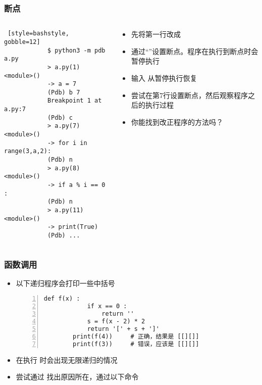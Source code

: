 \begin{CJK}{UTF8}{gbsn}
\begin{frame} [fragile]
	\frametitle{断点}
	\begin{columns}[T]
		\begin{column}[T]{.5\textwidth}
			{\small
			\begin{lstlisting} [style=bashstyle, gobble=12]
			$ python3 -m pdb a.py
			> a.py(1)<module>()
			-> a = 7
			(Pdb) b 7
			Breakpoint 1 at a.py:7
			(Pdb) c
			> a.py(7)<module>()
			-> for i in range(3,a,2):
			(Pdb) n
			> a.py(8)<module>()
			-> if a % i == 0 :
			(Pdb) n
			> a.py(11)<module>()
			-> print(True)
			(Pdb) ...
			\end{lstlisting}
			}
		\end{column}
		\begin{column}[T]{.5\textwidth}
			\linespread{1.5}
			\begin{itemize}
			\item 先将第一行改成 
			\item 通过``''设置断点。程序在执行到断点时会暂停执行
			\item 输入  从暂停执行恢复
			\item 尝试在第7行设置断点，然后观察程序之后的执行过程
			\item 你能找到改正程序的方法吗？
			\end{itemize}
		\end{column}
	\end{columns}
\end{frame}

\begin{frame} [fragile]
	\frametitle{函数调用}
	\linespread{1.25}
	\begin{itemize}
	\item 以下递归程序会打印一些中括号
		{\small
		\begin{lstlisting}[style=pythonstyle, gobble=8, frame=single, 
							numbers=left, numberstyle=\ttfamily, texcl]
		def f(x) :
			if x == 0 :
				return ''
			s = f(x - 2) * 2
			return '[' + s + ']'
		print(f(4))		# 正确，结果是 [[][]]
		print(f(3))		# 错误，应该是 [[][]]
		\end{lstlisting}
		}
	\item 在执行  时会出现无限递归的情况
	\item 尝试通过  找出原因所在，通过以下命令
	\end{itemize}
\end{frame}


\end{CJK}
